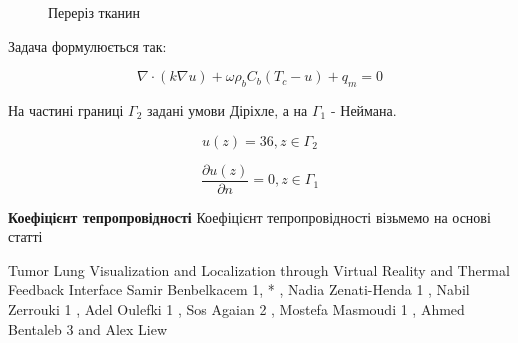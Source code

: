 \begin{figure}[ht!]
    \centering
    
    \caption{Переріз тканин}
    \label{fig:thermo_2d_domain}
\end{figure}

Задача формулюється так:

\begin{equation}
    \label{eqn:thermo_2d_1}
    \nabla \cdot (k \nabla u) + \omega \rho_b C_b (T_c - u) + q_m  = 0
\end{equation}

На частині границі $\Gamma_2$ задані умови Діріхле, а на $\Gamma_1$ - Неймана.

\begin{equation}
    \label{eqn:thermo_2d_2}
    u(z) = 36, z \in \Gamma_2
\end{equation}

\begin{equation}
    \label{eqn:thermo_2d_3}
    \dfrac{\partial{u(z)}}{\partial{n}} = 0, z \in \Gamma_1
\end{equation}

\textbf{Коефіцієнт тепропровідності} Коефіцієнт тепропровідності візьмемо на основі статті

Tumor Lung Visualization and Localization through Virtual
Reality and Thermal Feedback Interface
Samir Benbelkacem 1, * , Nadia Zenati-Henda 1 , Nabil Zerrouki 1 , Adel Oulefki 1 , Sos Agaian 2 ,
Mostefa Masmoudi 1 , Ahmed Bentaleb 3 and Alex Liew

